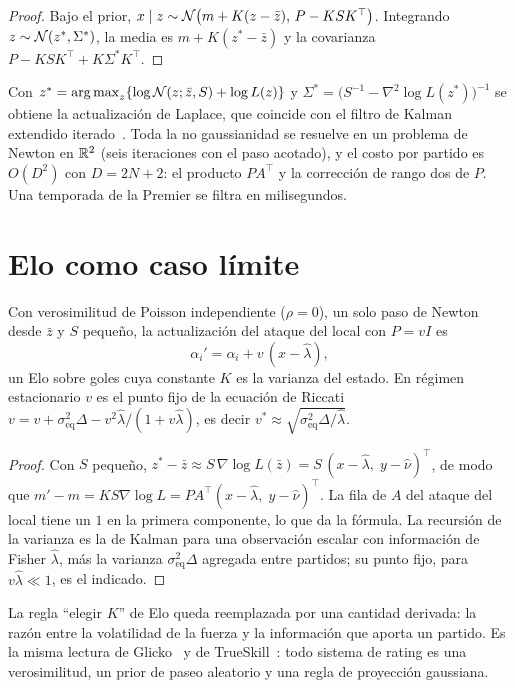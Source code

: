 \begin{proof}
Bajo el prior, $x\mid z\sim\mathcal{N}\big(m+K(z-\bar z),\,P-KSK^\top\big)$. Integrando $z\sim\mathcal{N}(z^*,\Sigma^*)$, la media es $m+K(z^*-\bar z)$ y la covarianza $P-KSK^\top+K\Sigma^*K^\top$.
\end{proof}

Con $z^*=\operatorname*{arg\,max}_z\{\log\mathcal{N}(z;\bar z,S)+\log L(z)\}$ y $\Sigma^*=\big(S^{-1}-\nabla^2\log L(z^*)\big)^{-1}$ se obtiene la actualización de Laplace, que coincide con el filtro de Kalman extendido iterado~\cite{bellcathey1993}. Toda la no gaussianidad se resuelve en un problema de Newton en $\mathbb{R}^2$ (seis iteraciones con el paso acotado), y el costo por partido es $O(D^2)$ con $D=2N+2$: el producto $PA^\top$ y la corrección de rango dos de $P$. Una temporada de la Premier se filtra en milisegundos.

\section{Elo como caso límite}
\label{sec:elo}

\begin{proposicion} \dem
Con verosimilitud de Poisson independiente ($\rho=0$), un solo paso de Newton desde $\bar z$ y $S$ pequeño, la actualización del ataque del local con $P=vI$ es
\[
\alpha_i'=\alpha_i+v\,(x-\hat\lambda),
\]
un Elo sobre goles cuya constante $K$ es la varianza del estado. En régimen estacionario $v$ es el punto fijo de la ecuación de Riccati $v=v+\sigma_\text{eq}^2\Delta-v^2\hat\lambda/(1+v\hat\lambda)$, es decir $v^*\approx\sqrt{\sigma_\text{eq}^2\Delta/\hat\lambda}$.
\end{proposicion}

\begin{proof}
Con $S$ pequeño, $z^*-\bar z\approx S\,\nabla\log L(\bar z)=S\,(x-\hat\lambda,\;y-\hat\nu)^\top$, de modo que $m'-m=KS\nabla\log L=PA^\top(x-\hat\lambda,\;y-\hat\nu)^\top$. La fila de $A$ del ataque del local tiene un $1$ en la primera componente, lo que da la fórmula. La recursión de la varianza es la de Kalman para una observación escalar con información de Fisher $\hat\lambda$, más la varianza $\sigma_\text{eq}^2\Delta$ agregada entre partidos; su punto fijo, para $v\hat\lambda\ll1$, es el indicado.
\end{proof}

La regla ``elegir $K$'' de Elo queda reemplazada por una cantidad derivada: la razón entre la volatilidad de la fuerza y la información que aporta un partido. Es la misma lectura de Glicko~\cite{glickman1999} y de TrueSkill~\cite{herbrich2007}: todo sistema de rating es una verosimilitud, un prior de paseo aleatorio y una regla de proyección gaussiana.

